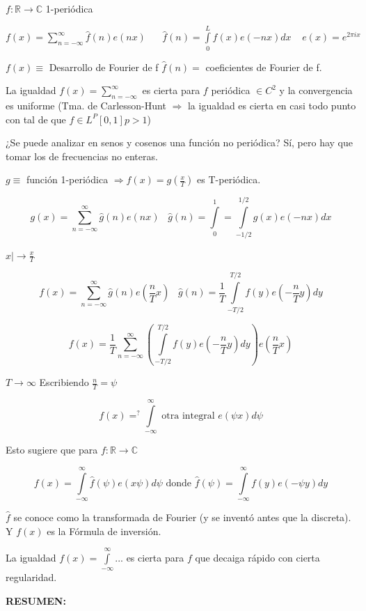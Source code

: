 


$ f: \mathbb{R} \rightarrow \mathbb{C} $ 1-periódica

$f(x) = \sum\limits_{n=-\infty}^{\infty} \hat{f}(n) e(nx) \;\;\;\;\;\; \hat{f}(n) = \int\limits_{0}^{L} f(x) e (-nx) dx \;\;\;\; e(x) = e^{2 \pi i x}$

$f(x) \equiv $ Desarrollo de Fourier de f \;\;\;\; $\hat{f}(n) =$ coeficientes de Fourier de f.

La igualdad $f(x) = \sum^{\infty}_{n=-\infty}$ es cierta para $f$ periódica $\in C^{2}$ y la convergencia es uniforme (Tma. de Carlesson-Hunt $\Rightarrow$ la igualdad es cierta en casi todo punto con tal de que $f \in L^{P} [0,1] p > 1$)

¿Se puede analizar en senos y cosenos una función no periódica? Sí, pero hay que tomar los de frecuencias no enteras.

$g \equiv $ función 1-periódica $ \Rightarrow f(x) = g(\frac{x}{T})$ es T-periódica.

$$ g(x) = \sum^{\infty}_{n=-\infty} \hat{g}(n) e(nx) \;\;\; \hat{g}(n) = \int\limits^{1}_{0} = \int\limits^{1/2}_{-1/2} g(x) e(-nx) dx $$

$x |\rightarrow \frac{x}{T} $

$$f(x) = \sum_{n = -\infty}^{\infty} \hat{g}(n) e(\frac{n}{T}x) \;\;\; \hat{g}(n) = \frac{1}{T} \int\limits^{T/2}_{-T/2} f(y) e(-\frac{n}{T}y) dy$$

$$f(x) = \frac{1}{T} \sum_{n = -\infty}^{\infty} \left(  \int\limits^{T/2}_{-T/2} f(y) e(-\frac{n}{T}y) dy \right) e (\frac{n}{T}x)$$

$T \rightarrow \infty$ Escribiendo $\frac{n}{T} = \psi$

$$ f(x) =^{?} \int\limits^{\infty}_{-\infty} \text{ otra integral } e(\psi x) d\psi $$

Esto sugiere que para $f: \mathbb{R} \rightarrow \mathbb{C}$

$$f(x) = \int\limits^{\infty}_{-\infty} \hat{f}(\psi) e (x \psi) d \psi \text{ donde } \hat{f}(\psi) = \int\limits^{\infty}_{-\infty} f(y) e(-\psi y)dy$$

$\hat{f}$ se conoce como la transformada de Fourier (y se inventó antes que la discreta). Y $f(x)$ es la Fórmula de inversión.

La igualdad $f(x) = \int\limits^{\infty}_{-\infty} $... es cierta para $f$ que decaiga rápido con cierta regularidad.

\newpage
\textbf{RESUMEN:}

